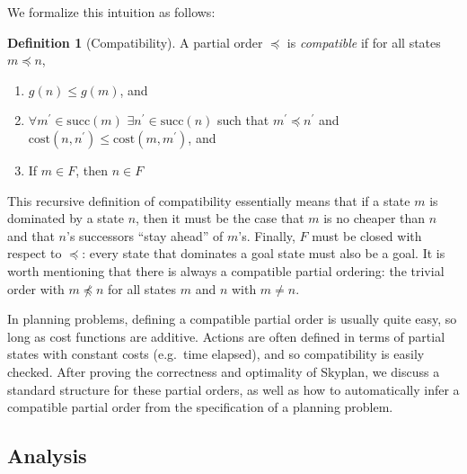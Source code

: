 \documentclass[letterpaper]{article}
\theoremstyle{plain} \newtheorem{theorem}{Theorem} \newtheorem{proposition}{Proposition} \newtheorem{lemma}{Lemma}
\theoremstyle{definition} \newtheorem{definition}{Definition} \newtheorem{conjecture}{Conjecture} \newtheorem*{example}{Example}
\theoremstyle{remark} \newtheorem*{remark}{Remark} \newtheorem*{note}{Note} \newtheorem{case}{Case}
\begin{document}
We formalize this intuition as follows:
\begin{definition}[Compatibility]
	\label{def-compatibility}
  A partial order $\preceq$ is \textit{compatible} if for all states $m \preceq n$,
  \begin{enumerate}
    \item $g(n) \le g(m)$, and 
    \item $\forall m^\prime \in \mathrm{succ}(m)$ $\exists n^\prime \in
      \mathrm{succ}(n)$ such that $m^\prime \preceq n^\prime$ and
      $\mathrm{cost}(n,n^\prime) \le \mathrm{cost}(m,m^\prime)$, and
    \item If $m \in F$, then $n \in F$
  \end{enumerate}
\end{definition}
This recursive definition of compatibility essentially means that
if a state $m$ is dominated by a state $n$, then it must be the
case that $m$ is no cheaper than $n$ and that $n$'s successors
``stay ahead'' of $m$'s. Finally, $F$ must be closed with respect
to $\preceq$: every state that dominates a goal state must also be
a goal. It is worth mentioning that there is always a compatible
partial ordering: the trivial order with $m \npreceq n$ for all
states $m$ and $n$ with $m \ne n$. 



In planning problems, defining a compatible partial order is usually
quite easy, so long as cost functions are additive.  Actions are
often defined in terms of partial states with constant costs (e.g.\
time elapsed), and so compatibility is easily checked.  After proving
the correctness and optimality of Skyplan, we discuss a standard
structure for these partial orders, as well as how to automatically
infer a compatible partial order from the specification of a planning problem.

\subsection{Analysis}
\end{document}
